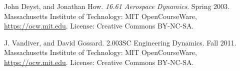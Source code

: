\renewcommand{\refname}{{Bibliography}}

\begin{thebibliography}{12}

John Deyst, and Jonathan How. \emph{16.61 Aerospace Dynamics}. Spring 2003. Massachusetts Institute of Technology: MIT OpenCourseWare, \url{https://ocw.mit.edu}. License: Creative Commons BY-NC-SA.

J. Vandiver, and David Gossard. 2.003SC Engineering Dynamics. Fall 2011. Massachusetts Institute of Technology: MIT OpenCourseWare, \url{https://ocw.mit.edu}. License: Creative Commons BY-NC-SA.

\end{thebibliography}


